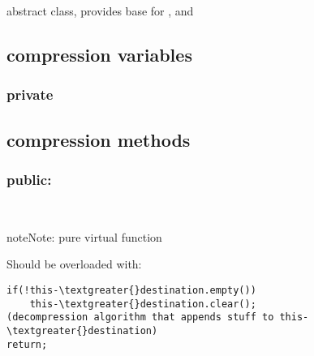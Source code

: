 \documentclass[letterpaper,10pt,english]{sphinxmanual}
\begin{document}
\begin{fulllineitems}
\label{compression:mobi::compression}
abstract class, provides base for {\hyperref[compression:mobi::pd_compression]{}}, {\hyperref[compression:mobi::no_compression]{}}
and {\hyperref[compression:mobi::hd_compression]{}}

\end{fulllineitems}



\subsection{compression variables}
\label{compression:compression-variables}

\subsubsection{private}
\label{compression:private}\begin{quote}

\begin{fulllineitems}
\label{compression:destination__ss}
\end{fulllineitems}

\end{quote}


\subsection{compression methods}
\label{compression:compression-methods}

\subsubsection{public:}
\label{compression:public}

\begin{fulllineitems}
\label{compression:compression::uncompress__uint8_tP.s}~
\begin{notice}{note}{Note:}
pure virtual function
\end{notice}

Should be overloaded with:

\begin{Verbatim}[commandchars=\\\{\}]
if(!this-\textgreater{}destination.empty())
    this-\textgreater{}destination.clear();
(decompression algorithm that appends stuff to this-\textgreater{}destination)
return;
\end{Verbatim}

\end{fulllineitems}
\end{document}
